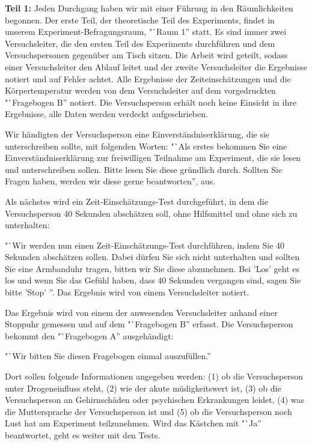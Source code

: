 \documentclass{Bericht}
\begin{document}
\textbf{Teil 1:}
Jeden Durchgang haben wir mit einer Führung in den Räumlichkeiten begonnen. Der erste Teil, der theoretische Teil des Experiments, findet in unserem Experiment-Befragungsraum, "`Raum 1'' statt. Es sind immer zwei Versuchsleiter, die den ersten Teil des Experiments durchführen und dem Versuchspersonen gegenüber am Tisch sitzen. Die Arbeit wird geteilt, sodass einer Versuchsleiter den Ablauf leitet und der zweite Versuchsleiter die Ergebnisse notiert und auf Fehler achtet. Alle Ergebnisse der Zeiteinschätzungen und die Körpertemperatur werden von dem Versuchsleiter auf dem vorgedruckten "`Fragebogen B'' notiert. Die Versuchsperson erhält noch keine Einsicht in ihre Ergebnisse, alle Daten werden verdeckt aufgeschrieben.

Wir händigten der Versuchsperson eine Einverständniserklärung, die sie unterschreiben sollte, mit folgenden Worten:
"`Als erstes bekommen Sie eine Einverständniserklärung zur freiwilligen Teilnahme am Experiment, die sie lesen und unterschreiben sollen. Bitte lesen Sie diese gründlich durch. Sollten Sie Fragen haben, werden wir diese gerne beantworten'', aus.

Als nächstes wird ein Zeit-Einschätzungs-Test durchgeführt, in dem die Versuchsperson 40 Sekunden abschätzen soll, ohne Hilfsmittel und ohne sich zu unterhalten:

"`Wir werden nun einen Zeit-Einschätzungs-Test durchführen, indem Sie 40 Sekunden abschätzen sollen. Dabei dürfen Sie sich nicht unterhalten und sollten Sie eine Armbanduhr tragen, bitten wir Sie diese abzunehmen.  Bei 'Los' geht es los und wenn Sie das Gefühl haben, dass 40 Sekunden vergangen sind, sagen Sie bitte 'Stop' ''. Das Ergebnis wird von einem Versuchsleiter notiert.

Das Ergebnis wird von einem der anwesenden Versuchsleiter anhand einer Stoppuhr gemessen und auf dem "`Fragebogen B'' erfasst. Die Versuchsperson bekommt den "`Fragebogen A'' ausgehändigt:

"`Wir bitten Sie diesen Fragebogen einmal auszufüllen.''

Dort sollen folgende Informationen angegeben werden: (1) ob die Versuchsperson unter Drogeneinfluss steht, (2) wie der akute müdigkeitswert ist, (3) ob die Versuchsperson an Gehirnschäden oder psychischen Erkrankungen leidet, (4) was die Muttersprache der Versuchsperson ist und (5) ob die Versuchsperson noch Lust hat am Experiment teilzunehmen. Wird das Kästchen mit "`Ja'' beantwortet, geht es weiter mit den Tests.
\end{document}
